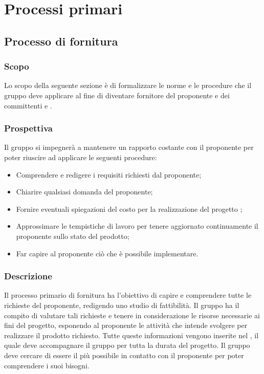 \section{Processi primari}
\subsection{Processo di fornitura}
\subsubsection{Scopo}
Lo scopo della seguente sezione è di formalizzare le norme e le procedure che il gruppo \Gruppo{} deve applicare al fine di diventare fornitore del proponente \Proponente{} e dei committenti \VT{} e \CR{}.

\subsubsection{Prospettiva}
Il gruppo si impegnerà a mantenere un rapporto costante con il proponente per poter riuscire ad applicare le seguenti procedure:
\begin{itemize}
	\item Comprendere e redigere i requisiti richiesti dal proponente;
	\item Chiarire qualsiasi domanda del proponente;
	\item Fornire eventuali spiegazioni del costo per la realizzazione del progetto \NomeProgetto{};
	\item Approssimare le tempistiche di lavoro per tenere aggiornato continuamente il proponente sullo stato del prodotto; 
	\item Far capire al proponente ciò che è possibile implementare.
\end{itemize}

\subsubsection{Descrizione} 
Il processo primario di fornitura ha l'obiettivo di capire e comprendere tutte le richieste del proponente, redigendo uno studio di fattibilità. 
Il gruppo \Gruppo{} ha il compito di valutare tali richieste e tenere in considerazione le risorse necessarie ai fini del progetto, esponendo al proponente \Proponente{} le attività che intende svolgere per realizzare il prodotto richiesto.
Tutte queste informazioni vengono inserite nel \PdP{}, il quale deve accompagnare il gruppo per tutta la durata del progetto.
Il gruppo \Gruppo{} deve cercare di essere il più possibile in contatto con il proponente per poter comprendere i suoi bisogni.\\

